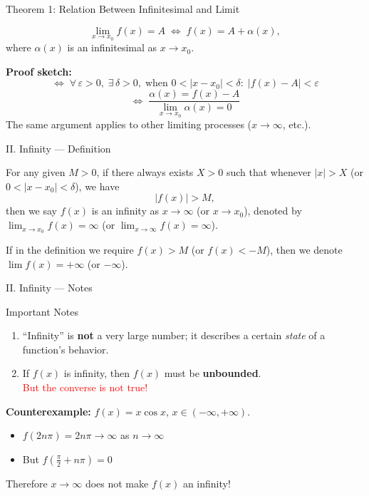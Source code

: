 \documentclass[UTF8,10pt]{beamer}
\begin{document}
\begin{frame}{Theorem 1: Relation Between Infinitesimal and Limit}
\begin{theorem}
\[
\lim_{x \to x_0} f(x) = A \;\Longleftrightarrow\; f(x) = A + \alpha(x),
\]
where $\alpha(x)$ is an infinitesimal as $x \to x_0$.
\end{theorem}
\pause
\textbf{Proof sketch:}
\[
\Longleftrightarrow\; \forall\,\varepsilon>0,\; \exists\,\delta>0,\;
\text{when } 0<|x-x_0|<\delta:\; |f(x)-A|<\varepsilon
\]
\pause
\[
\Longleftrightarrow\; \frac{\alpha(x)=f(x)-A}{\displaystyle\lim_{x\to x_0}\alpha(x)=0}
\]
\pause
\vspace{0.3em}
\small The same argument applies to other limiting processes ($x\to\infty$, etc.).
\end{frame}

\begin{frame}{II. Infinity --- Definition}
\begin{definition}[Infinity]
For any given $M > 0$, if there always exists $X > 0$ such that whenever $|x| > X$ (or $0<|x-x_0|<\delta$), we have
\[
|f(x)| > M,
\]
then we say $f(x)$ is an \alert{infinity} as $x \to \infty$ (or $x \to x_0$), denoted by
$\displaystyle \lim_{x\to x_0} f(x) = \infty$ (or $\displaystyle \lim_{x\to\infty} f(x) = \infty$).
\end{definition}
\pause
\vspace{0.3em}
\small If in the definition we require $f(x) > M$ (or $f(x) < -M$), then we denote
$\displaystyle \lim f(x) = +\infty$ (or $-\infty$).
\end{frame}

\begin{frame}{II. Infinity --- Notes}
\begin{block}{Important Notes}
\begin{enumerate}
    \item<1-> ``Infinity'' is \textbf{not} a very large number; it describes a certain \emph{state} of a function's behavior.
    \item<2-> If $f(x)$ is infinity, then $f(x)$ must be \textbf{unbounded}.\\[0.3em]
          \textcolor{red}{But the converse is not true!}
\end{enumerate}
\end{block}
\pause\pause
\vspace{0.3em}
\textbf{Counterexample:} $f(x) = x\cos x$, $x \in (-\infty, +\infty)$.
\pause
\begin{itemize}
    \item $f(2n\pi) = 2n\pi \to \infty$ as $n \to \infty$
    \item But $f(\frac{\pi}{2}+n\pi) = 0$
\end{itemize}
\pause
Therefore $x \to \infty$ does not make $f(x)$ an infinity!
\end{frame}
\end{document}
